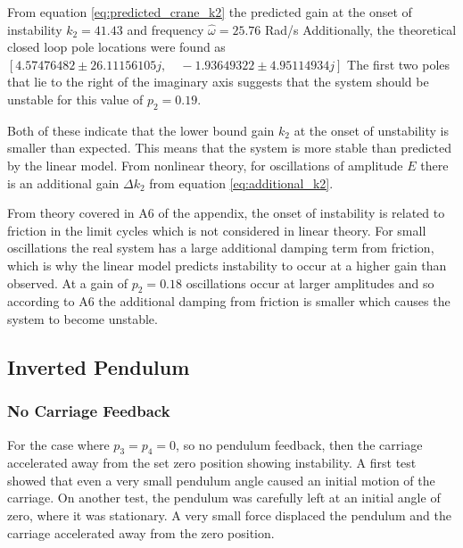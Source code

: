 \documentclass{article}
\begin{document}
From equation \ref{eq:predicted_crane_k2} the predicted gain at the onset of instability $k_2 = 41.43$ and frequency $\hat{\omega} = 25.76$ Rad/s
Additionally, the theoretical closed loop pole locations were found as \\ 
$[ 4.57476482 \pm 26.11156105j , \quad -1.93649322 \pm 4.95114934j]$
The first two poles that lie to the right of the imaginary axis suggests that the system should be unstable for this value of $p_2 = 0.19$.

Both of these indicate that the lower bound gain $k_2$ at the onset of unstability is smaller than expected. This means that the system is more stable than predicted by the linear model.
From nonlinear theory, for oscillations of amplitude $E$ there is an additional gain $\Delta k_2$ from equation \ref{eq:additional_k2}.

From theory covered in A6 of the appendix, the onset of instability is related to friction in the limit cycles which is not considered in linear theory.
For small oscillations the real system has a large additional damping term from friction, which is why the linear model predicts instability to occur at a higher gain than observed.
At a gain of $p_2 = 0.18$ oscillations occur at larger amplitudes and so according to A6 the additional damping from friction is smaller which causes the system to become unstable.

\subsection{Inverted Pendulum}

\subsubsection{No Carriage Feedback}

For the case where $p_3 = p_4 = 0$, so no pendulum feedback, then the carriage accelerated away from the set zero position showing instability.
A first test showed that even a very small pendulum angle caused an initial motion of the carriage.
On another test, the pendulum was carefully left at an initial angle of zero, where it was stationary.
A very small force displaced the pendulum and the carriage accelerated away from the zero position. 
\end{document}
